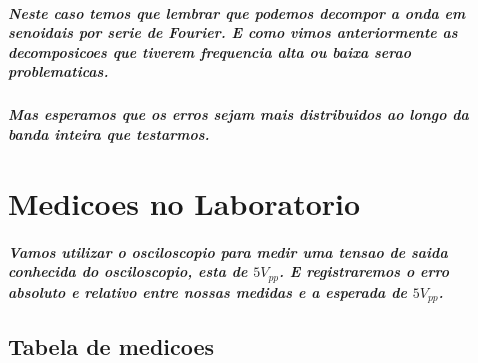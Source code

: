 \documentclass[12pt,twoside, a4paper, twocolumn]{article}
\begin{document}
\subparagraph*{Neste caso temos que lembrar que podemos decompor a onda em senoidais por serie de Fourier. E como vimos anteriormente as decomposicoes que tiverem frequencia alta ou baixa serao problematicas.}

\subparagraph*{Mas esperamos que os erros sejam mais distribuidos ao longo da banda inteira que testarmos.}

\section{Medicoes no Laboratorio}

\subparagraph*{Vamos utilizar o osciloscopio para medir uma tensao de saida  conhecida do osciloscopio, esta de $5 V_{pp}$. E registraremos o erro absoluto e relativo entre nossas medidas e a esperada de  $5 V_{pp}$.}

\subsection{Tabela de medicoes}
\end{document}
